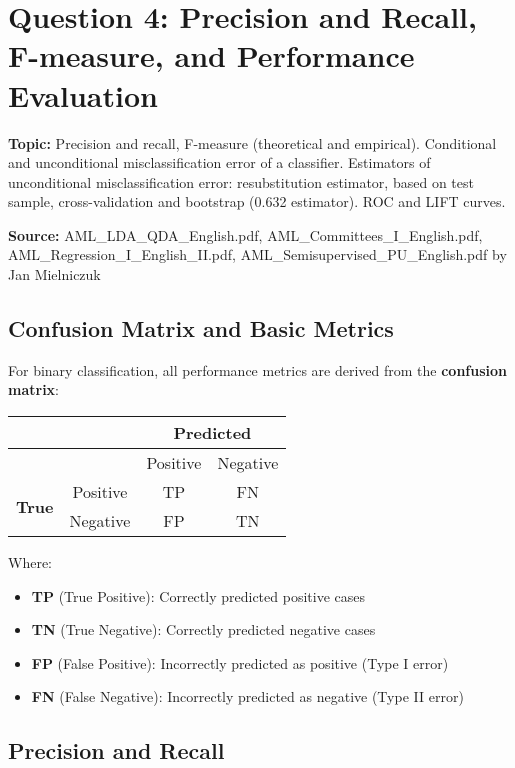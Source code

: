 \documentclass[12pt,a4paper]{article}
\begin{document}
\newpage
\section{Question 4: Precision and Recall, F-measure, and Performance Evaluation}

\textbf{Topic:} Precision and recall, F-measure (theoretical and empirical). Conditional and unconditional misclassification error of a classifier. Estimators of unconditional misclassification error: resubstitution estimator, based on test sample, cross-validation and bootstrap (0.632 estimator). ROC and LIFT curves.

\textbf{Source:} AML\_LDA\_QDA\_English.pdf, AML\_Committees\_I\_English.pdf, AML\_Regression\_I\_English\_II.pdf, AML\_Semisupervised\_PU\_English.pdf by Jan Mielniczuk

\subsection{Confusion Matrix and Basic Metrics}

For binary classification, all performance metrics are derived from the \textbf{confusion matrix}:

\begin{table}[h]
\centering
\begin{tabular}{|c|c|c|c|}
\hline
& & \multicolumn{2}{|c|}{\textbf{Predicted}} \\
\hline
& & Positive & Negative \\
\hline
\multirow{2}{*}{\textbf{True}} & Positive & TP & FN \\
\hline
& Negative & FP & TN \\
\hline
\end{tabular}
\end{table}

Where:
\begin{itemize}
    \item \textbf{TP} (True Positive): Correctly predicted positive cases
    \item \textbf{TN} (True Negative): Correctly predicted negative cases  
    \item \textbf{FP} (False Positive): Incorrectly predicted as positive (Type I error)
    \item \textbf{FN} (False Negative): Incorrectly predicted as negative (Type II error)
\end{itemize}

\subsection{Precision and Recall}
\end{document}

